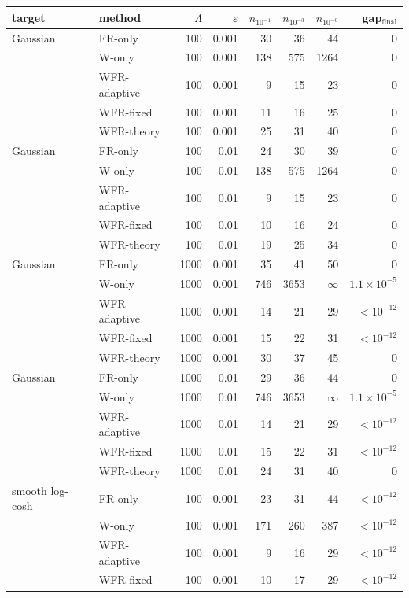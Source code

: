 \begin{tabular}{llrrrrrr}
\toprule
target & method & $\Lambda$ & $\varepsilon$ & $n_{10^{-1}}$ & $n_{10^{-3}}$ & $n_{10^{-6}}$ & gap$_{\mathrm{final}}$ \\
\midrule
Gaussian & FR-only & 100 & 0.001 & 30 & 36 & 44 & 0 \\
 & W-only & 100 & 0.001 & 138 & 575 & 1264 & 0 \\
 & WFR-adaptive & 100 & 0.001 & 9 & 15 & 23 & 0 \\
 & WFR-fixed & 100 & 0.001 & 11 & 16 & 25 & 0 \\
 & WFR-theory & 100 & 0.001 & 25 & 31 & 40 & 0 \\
\midrule
Gaussian & FR-only & 100 & 0.01 & 24 & 30 & 39 & 0 \\
 & W-only & 100 & 0.01 & 138 & 575 & 1264 & 0 \\
 & WFR-adaptive & 100 & 0.01 & 9 & 15 & 23 & 0 \\
 & WFR-fixed & 100 & 0.01 & 10 & 16 & 24 & 0 \\
 & WFR-theory & 100 & 0.01 & 19 & 25 & 34 & 0 \\
\midrule
Gaussian & FR-only & 1000 & 0.001 & 35 & 41 & 50 & 0 \\
 & W-only & 1000 & 0.001 & 746 & 3653 & $\infty$ & $1.1\times10^{-5}$ \\
 & WFR-adaptive & 1000 & 0.001 & 14 & 21 & 29 & $<\!10^{-12}$ \\
 & WFR-fixed & 1000 & 0.001 & 15 & 22 & 31 & $<\!10^{-12}$ \\
 & WFR-theory & 1000 & 0.001 & 30 & 37 & 45 & 0 \\
\midrule
Gaussian & FR-only & 1000 & 0.01 & 29 & 36 & 44 & 0 \\
 & W-only & 1000 & 0.01 & 746 & 3653 & $\infty$ & $1.1\times10^{-5}$ \\
 & WFR-adaptive & 1000 & 0.01 & 14 & 21 & 29 & $<\!10^{-12}$ \\
 & WFR-fixed & 1000 & 0.01 & 15 & 22 & 31 & $<\!10^{-12}$ \\
 & WFR-theory & 1000 & 0.01 & 24 & 31 & 40 & 0 \\
\midrule
smooth log-cosh & FR-only & 100 & 0.001 & 23 & 31 & 44 & $<\!10^{-12}$ \\
 & W-only & 100 & 0.001 & 171 & 260 & 387 & $<\!10^{-12}$ \\
 & WFR-adaptive & 100 & 0.001 & 9 & 16 & 29 & $<\!10^{-12}$ \\
 & WFR-fixed & 100 & 0.001 & 10 & 17 & 29 & $<\!10^{-12}$ \\

\end{tabular}
